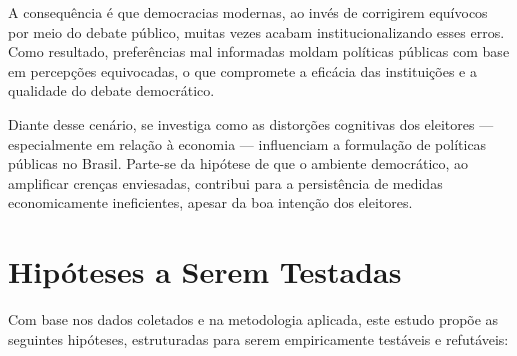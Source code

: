 A consequência é que democracias modernas, ao invés de corrigirem equívocos por meio do debate público, muitas vezes acabam institucionalizando esses erros. Como resultado, preferências mal informadas moldam políticas públicas com base em percepções equivocadas, o que compromete a eficácia das instituições e a qualidade do debate democrático.

Diante desse cenário, se investiga como as distorções cognitivas dos eleitores — especialmente em relação à economia — influenciam a formulação de políticas públicas no Brasil. Parte-se da hipótese de que o ambiente democrático, ao amplificar crenças enviesadas, contribui para a persistência de medidas economicamente ineficientes, apesar da boa intenção dos eleitores.

\section{Hipóteses a Serem Testadas}

Com base nos dados coletados e na metodologia aplicada, este estudo propõe as seguintes hipóteses, estruturadas para serem empiricamente testáveis e refutáveis:

